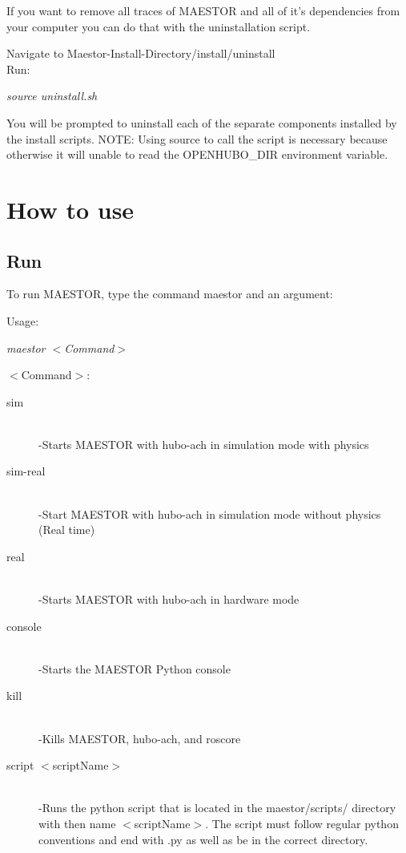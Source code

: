 \documentclass[12pt]{article}
\begin{document}
If you want to remove all traces of MAESTOR and all of it's dependencies from your computer you can do that with the uninstallation script.

Navigate to Maestor-Install-Directory/install/uninstall\\
Run:
\begin{center}
	\textit{	source uninstall.sh}
\end{center}

You will be prompted to uninstall each of the separate components installed by the install scripts. 
NOTE: Using source to call the script is necessary because otherwise it will unable to read the OPENHUBO\_DIR environment variable.
\pagebreak

\section{How to use}

\subsection{Run}

To run MAESTOR, type the command maestor and an argument:

Usage:
\begin{center}
	\textit{maestor $<$Command$>$} 
\end{center}
$<$Command$>$:
	\begin{description}
		\item[sim] \hfill \\
		-Starts MAESTOR with hubo-ach in simulation mode with physics
		\item[sim-real] \hfill \\
		-Start MAESTOR with hubo-ach in simulation mode without physics (Real time)
		\item[real] \hfill \\
		-Starts MAESTOR with hubo-ach in hardware mode
		\item[console] \hfill \\ 
		-Starts the MAESTOR Python console
		\item[kill] \hfill \\
		-Kills MAESTOR, hubo-ach, and roscore
		\item[script $<$scriptName$>$] \hfill \\
		-Runs the python script that is located in the maestor/scripts/ directory with then name $<$scriptName$>$. The script must follow regular python conventions and end with .py as well as be in the correct directory.
	\end{description}
\end{document}
